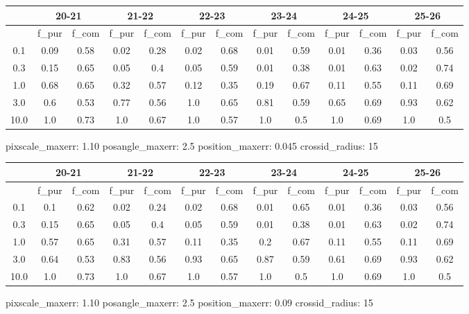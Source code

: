\documentclass{article}
\begin{document}
\begin{figure}[H]
\centering
\begin{tabular}{|c|c|c|c|c|c|c|c|c|c|c|c|c|}
\hline
\multicolumn{1}{|c|}{} & \multicolumn{2}{|c|}{20-21} & \multicolumn{2}{|c|}{21-22} & \multicolumn{2}{|c|}{22-23} & \multicolumn{2}{|c|}{23-24} & \multicolumn{2}{|c|}{24-25} & \multicolumn{2}{|c|}{25-26}\\
\hline \hline
 & f\_pur & f\_com & f\_pur & f\_com & f\_pur & f\_com & f\_pur & f\_com & f\_pur & f\_com & f\_pur & f\_com \\
\hline
0.1 & 0.09 & 0.58 & 0.02 & 0.28 & 0.02 & 0.68 & 0.01 & 0.59 & 0.01 & 0.36 & 0.03 & 0.56\\
\hline
0.3 & 0.15 & 0.65 & 0.05 & 0.4 & 0.05 & 0.59 & 0.01 & 0.38 & 0.01 & 0.63 & 0.02 & 0.74\\
\hline
1.0 & 0.68 & 0.65 & 0.32 & 0.57 & 0.12 & 0.35 & 0.19 & 0.67 & 0.11 & 0.55 & 0.11 & 0.69\\
\hline
3.0 & 0.6 & 0.53 & 0.77 & 0.56 & 1.0 & 0.65 & 0.81 & 0.59 & 0.65 & 0.69 & 0.93 & 0.62\\
\hline
10.0 & 1.0 & 0.73 & 1.0 & 0.67 & 1.0 & 0.57 & 1.0 & 0.5 & 1.0 & 0.69 & 1.0 & 0.5\\
\hline
\end{tabular}
\caption{pixscale\_maxerr: 1.10 posangle\_maxerr: 2.5 position\_maxerr: 0.045 crossid\_radius: 15}
\end{figure}

\begin{figure}[H]
\centering
\begin{tabular}{|c|c|c|c|c|c|c|c|c|c|c|c|c|}
\hline
\multicolumn{1}{|c|}{} & \multicolumn{2}{|c|}{20-21} & \multicolumn{2}{|c|}{21-22} & \multicolumn{2}{|c|}{22-23} & \multicolumn{2}{|c|}{23-24} & \multicolumn{2}{|c|}{24-25} & \multicolumn{2}{|c|}{25-26}\\
\hline \hline
 & f\_pur & f\_com & f\_pur & f\_com & f\_pur & f\_com & f\_pur & f\_com & f\_pur & f\_com & f\_pur & f\_com \\
\hline
0.1 & 0.1 & 0.62 & 0.02 & 0.24 & 0.02 & 0.68 & 0.01 & 0.65 & 0.01 & 0.36 & 0.03 & 0.56\\
\hline
0.3 & 0.15 & 0.65 & 0.05 & 0.4 & 0.05 & 0.59 & 0.01 & 0.38 & 0.01 & 0.63 & 0.02 & 0.74\\
\hline
1.0 & 0.57 & 0.65 & 0.31 & 0.57 & 0.11 & 0.35 & 0.2 & 0.67 & 0.11 & 0.55 & 0.11 & 0.69\\
\hline
3.0 & 0.64 & 0.53 & 0.83 & 0.56 & 0.93 & 0.65 & 0.87 & 0.59 & 0.61 & 0.69 & 0.93 & 0.62\\
\hline
10.0 & 1.0 & 0.73 & 1.0 & 0.67 & 1.0 & 0.57 & 1.0 & 0.5 & 1.0 & 0.69 & 1.0 & 0.5\\
\hline
\end{tabular}
\caption{pixscale\_maxerr: 1.10 posangle\_maxerr: 2.5 position\_maxerr: 0.09 crossid\_radius: 15}
\end{figure}
\end{document}
